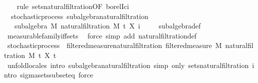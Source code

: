 \begin{isabellebody}
%
\isadelimproof
\ \ %
\endisadelimproof
%
\isatagproof
{}\isamarkupfalse%
\ {\isacharparenleft}{\kern0pt}rule\ sets{\isacharunderscore}{\kern0pt}natural{\isacharunderscore}{\kern0pt}filtration{\isacharprime}{\kern0pt}{\isacharbrackleft}{\kern0pt}OF\ borel{\isacharunderscore}{\kern0pt}Ici{\isacharbrackright}{\kern0pt}{\isacharparenright}{\kern0pt}%
\endisatagproof
{\isafoldproof}%
%
\isadelimproof
\isanewline
%
\endisadelimproof
\isanewline
{}\isamarkupfalse%
\ {\isacharparenleft}{\kern0pt}\ stochastic{\isacharunderscore}{\kern0pt}process{\isacharparenright}{\kern0pt}\ subalgebra{\isacharunderscore}{\kern0pt}natural{\isacharunderscore}{\kern0pt}filtration{\isacharcolon}{\kern0pt}\ \isanewline
\ \ \ {\isachardoublequoteopen}subalgebra\ M\ {\isacharparenleft}{\kern0pt}natural{\isacharunderscore}{\kern0pt}filtration\ M\ t\ X\ i{\isacharparenright}{\kern0pt}{\isachardoublequoteclose}\ \isanewline
%
\isadelimproof
\ \ %
\endisadelimproof
%
\isatagproof
{}\isamarkupfalse%
\ subalgebra{\isacharunderscore}{\kern0pt}def\ \isamarkupfalse%
\ measurable{\isacharunderscore}{\kern0pt}family{\isacharunderscore}{\kern0pt}iff{\isacharunderscore}{\kern0pt}sets\ \isamarkupfalse%
\ {\isacharparenleft}{\kern0pt}force\ simp\ add{\isacharcolon}{\kern0pt}\ natural{\isacharunderscore}{\kern0pt}filtration{\isacharunderscore}{\kern0pt}def{\isacharparenright}{\kern0pt}%
\endisatagproof
{\isafoldproof}%
%
\isadelimproof
\isanewline
%
\endisadelimproof
\isanewline
{}\isamarkupfalse%
\ stochastic{\isacharunderscore}{\kern0pt}process\ {\isasymsubseteq}\ filtered{\isacharunderscore}{\kern0pt}measure{\isacharunderscore}{\kern0pt}natural{\isacharunderscore}{\kern0pt}filtration{\isacharcolon}{\kern0pt}\ filtered{\isacharunderscore}{\kern0pt}measure\ M\ {\isachardoublequoteopen}natural{\isacharunderscore}{\kern0pt}filtration\ M\ t\ X{\isachardoublequoteclose}\ t\isanewline
%
\isadelimproof
\ \ \ \ %
\endisadelimproof
%
\isatagproof
{}\isamarkupfalse%
\ {\isacharparenleft}{\kern0pt}unfold{\isacharunderscore}{\kern0pt}locales{\isacharparenright}{\kern0pt}\ {\isacharparenleft}{\kern0pt}intro\ subalgebra{\isacharunderscore}{\kern0pt}natural{\isacharunderscore}{\kern0pt}filtration{\isacharcomma}{\kern0pt}\ simp\ only{\isacharcolon}{\kern0pt}\ sets{\isacharunderscore}{\kern0pt}natural{\isacharunderscore}{\kern0pt}filtration{\isacharcomma}{\kern0pt}\ intro\ sigma{\isacharunderscore}{\kern0pt}sets{\isacharunderscore}{\kern0pt}subseteq{\isacharcomma}{\kern0pt}\ force{\isacharparenright}{\kern0pt}%

\end{isabellebody}
